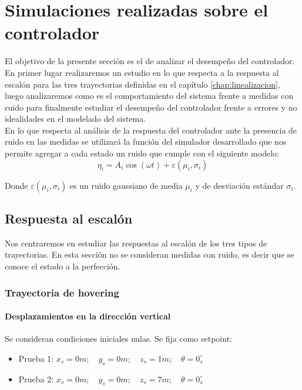 \documentclass[main]{subfiles}
\begin{document}
\chapter{Simulaciones realizadas sobre el controlador}
\label{chap:sim_control}

El objetivo de la presente secci\'on es el de analizar el desempeño del controlador. En primer lugar realizaremos un estudio en lo que respecta a la respuesta al escal\'on para las tres trayectorias definidas en el cap\'itulo \ref{chap:linealizacion}, luego analizaremos como es el comportamiento del sistema frente a medidas con ruido para finalmente estudiar el desempeño del controlador frente a errores y no idealidades en el modelado del sistema.\\

En lo que respecta al an\'alisis de la respuesta del controlador ante la presencia de ruido en las medidas se utilizar\'a la funci\'on del simulador desarrollado que nos permite agregar a cada estado un ruido que cumple con el siguiente modelo:
\begin{equation}
\label{eq:noise}
\eta_i = A_i\cos(\omega t)+\varepsilon(\mu_i,\sigma_i)
\end{equation}

Donde $\varepsilon(\mu_i,\sigma_i)$ es un ruido gaussiano de media $\mu_i$ y de desviaci\'on est\'andar $\sigma_i$.

\section{Respuesta al escal\'on}
Nos centraremos en estudiar las respuestas al escal\'on de los tres tipos de trayectorias. En esta secci\'on no se consideran medidas con ruido, es decir que se conoce el estado a la perfecci\'on.  

\subsection{Trayectoria de hovering}

\subsubsection{Desplazamientos en la direcci\'on vertical}
Se consideran condiciones iniciales nulas. Se fija como setpoint:
\begin{itemize}
\item Prueba 1: ${x_s = 0 m;\quad y_s = 0 m;\quad z_s = 1 m;\quad \theta = 0_s^\circ}$
\item Prueba 2: ${x_s = 0 m;\quad y_s = 0 m;\quad z_s = 7 m;\quad \theta = 0_s^\circ}$
\end{itemize}
\end{document}

